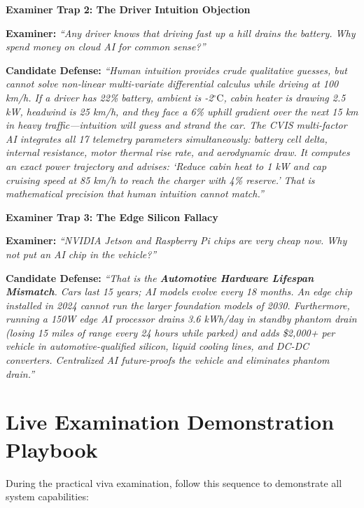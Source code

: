 \documentclass[12pt,a4paper]{report}
\newenvironment{dialoguebox}[1]{%
  \begin{mdframed}[backgroundcolor=cvislightbg,
    linecolor=cvisteal,linewidth=1.5pt,
    innerleftmargin=10pt,innerrightmargin=10pt,
    innertopmargin=6pt,innerbottommargin=6pt]
  \textbf{\color{cvisblue}#1}\par\smallskip}
  {\end{mdframed}}
\begin{document}
\begin{dialoguebox}{Examiner Trap 2: The Driver Intuition Objection}
\textbf{Examiner:} \textit{``Any driver knows that driving fast up a hill drains the battery. Why spend money on cloud AI for common sense?''}

\textbf{Candidate Defense:} 
\textit{``Human intuition provides crude qualitative guesses, but cannot solve non-linear multi-variate differential calculus while driving at 100 km/h. If a driver has 22\% battery, ambient is -2$^\circ\text{C}$, cabin heater is drawing 2.5 kW, headwind is 25 km/h, and they face a 6\% uphill gradient over the next 15 km in heavy traffic---intuition will guess and strand the car. The CVIS multi-factor AI integrates all 17 telemetry parameters simultaneously: battery cell delta, internal resistance, motor thermal rise rate, and aerodynamic draw. It computes an exact power trajectory and advises: `Reduce cabin heat to 1 kW and cap cruising speed at 85 km/h to reach the charger with 4\% reserve.' That is mathematical precision that human intuition cannot match.''}
\end{dialoguebox}

\begin{dialoguebox}{Examiner Trap 3: The Edge Silicon Fallacy}
\textbf{Examiner:} \textit{``NVIDIA Jetson and Raspberry Pi chips are very cheap now. Why not put an AI chip in the vehicle?''}

\textbf{Candidate Defense:} 
\textit{``That is the \textbf{Automotive Hardware Lifespan Mismatch}. Cars last 15 years; AI models evolve every 18 months. An edge chip installed in 2024 cannot run the larger foundation models of 2030. Furthermore, running a 150W edge AI processor drains 3.6 kWh/day in standby phantom drain (losing 15 miles of range every 24 hours while parked) and adds \$2,000+ per vehicle in automotive-qualified silicon, liquid cooling lines, and DC-DC converters. Centralized AI future-proofs the vehicle and eliminates phantom drain.''}
\end{dialoguebox}

\section{Live Examination Demonstration Playbook}

During the practical viva examination, follow this sequence to demonstrate all system capabilities:
\end{document}
